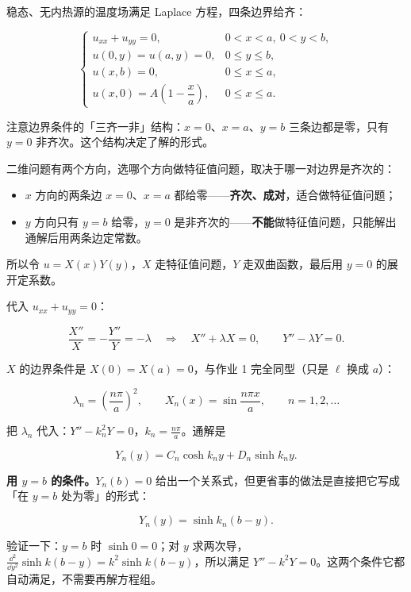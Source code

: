 
稳态、无内热源的温度场满足 Laplace 方程，四条边界给齐：

\[
\begin{cases}
u_{xx}+u_{yy}=0, & 0<x<a,\ 0<y<b,\\[2pt]
u(0,y)=u(a,y)=0, & 0\le y\le b,\\[2pt]
u(x,b)=0, & 0\le x\le a,\\[2pt]
u(x,0)=A\left(1-\dfrac{x}{a}\right), & 0\le x\le a .
\end{cases}
\]

注意边界条件的「三齐一非」结构：$x=0$、$x=a$、$y=b$ 三条边都是零，只有 $y=0$ 非齐次。这个结构决定了解的形式。


二维问题有两个方向，选哪个方向做特征值问题，取决于哪一对边界是齐次的：

\begin{itemize}
  \item $x$ 方向的两条边 $x=0$、$x=a$ 都给零——\textbf{齐次、成对}，适合做特征值问题；
  \item $y$ 方向只有 $y=b$ 给零，$y=0$ 是非齐次的——\textbf{不能}做特征值问题，只能解出通解后用两条边定常数。
\end{itemize}

所以令 $u=X(x)Y(y)$，$X$ 走特征值问题，$Y$ 走双曲函数，最后用 $y=0$ 的展开定系数。


代入 $u_{xx}+u_{yy}=0$：

\[
\frac{X''}{X}=-\frac{Y''}{Y}=-\lambda
\quad\Longrightarrow\quad
X''+\lambda X=0,\qquad Y''-\lambda Y=0 .
\]

$X$ 的边界条件是 $X(0)=X(a)=0$，与作业 1 完全同型（只是 $\ell$ 换成 $a$）：

\[
\lambda_n=\left(\frac{n\pi}{a}\right)^2,
\qquad
X_n(x)=\sin\frac{n\pi x}{a},
\qquad n=1,2,\dots
\]


把 $\lambda_n$ 代入：$Y''-k_n^2Y=0$，$k_n=\frac{n\pi}{a}$。通解是

\[
Y_n(y)=C_n\cosh k_ny+D_n\sinh k_ny .
\]

\textbf{用 $y=b$ 的条件。}$Y_n(b)=0$ 给出一个关系式，但更省事的做法是直接把它写成「在 $y=b$ 处为零」的形式：

\[
Y_n(y)=\sinh k_n(b-y).
\]

验证一下：$y=b$ 时 $\sinh0=0$；对 $y$ 求两次导，$\frac{\dd^2}{\dd y^2}\sinh k(b-y)=k^2\sinh k(b-y)$，所以满足 $Y''-k^2Y=0$。这两个条件它都自动满足，不需要再解方程组。

